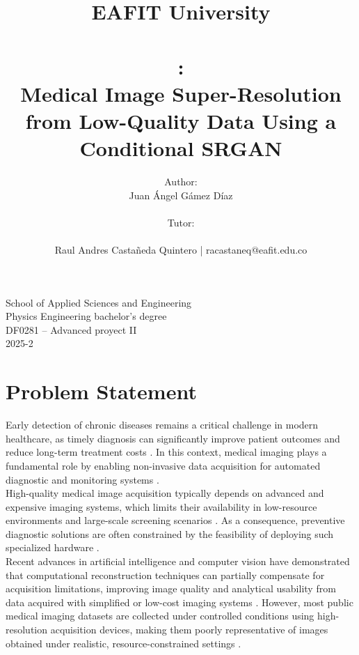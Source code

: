 \documentclass[12pt,letterpaper]{article}     %
\author{\small{Author:}\\Juan Ángel Gámez Díaz \\
\\ \small{ Tutor:}\\ 
\\Raul Andres Castañeda Quintero | racastaneq@eafit.edu.co
\\ 
\vspace*{2.1in}}
\title{EAFIT University
\\{\small \\\vspace*{0.55in} :}\\ Medical Image Super-Resolution from Low-Quality Data Using a Conditional SRGAN \vspace*{1.3in}}
\begin{document}


\maketitle							%
{\centering School of Applied Sciences and Engineering\\Physics Engineering bachelor's degree\\DF0281 – Advanced proyect II\\2025-2\par}


\newpage
\tableofcontents
\newpage




\section{Problem Statement}

Early detection of chronic diseases remains a critical challenge in modern healthcare, as timely diagnosis can significantly improve patient outcomes and reduce long-term treatment costs \cite{earlydetection}. In this context, medical imaging plays a fundamental role by enabling non-invasive data acquisition for automated diagnostic and monitoring systems \cite{noninvasive}.\\

\noindent High-quality medical image acquisition typically depends on advanced and expensive imaging systems, which limits their availability in low-resource environments and large-scale screening scenarios \cite{3}. As a consequence, preventive diagnostic solutions are often constrained by the feasibility of deploying such specialized hardware \cite{zhang}.\\

\noindent Recent advances in artificial intelligence and computer vision have demonstrated that computational reconstruction techniques can partially compensate for acquisition limitations, improving image quality and analytical usability from data acquired with simplified or low-cost imaging systems \cite{QUINTA}. However, most public medical imaging datasets are collected under controlled conditions using high-resolution acquisition devices, making them poorly representative of images obtained under realistic, resource-constrained settings \cite{ML}.\\
\end{document}
